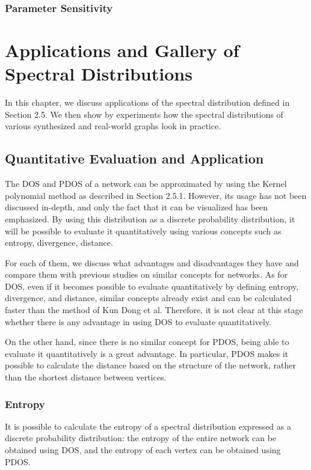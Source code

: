 \documentclass[senior,final,11pt]{iscs-thesis}
\begin{document}
\subsection{Parameter Sensitivity}




\chapter{Applications and Gallery of Spectral Distributions}
In this chapter, we discuss applications of the spectral distribution defined in Section 2.5. We then show by experiments how the spectral distributions of various synthesized and real-world graphs look in practice.

\section{Quantitative Evaluation and Application}
The DOS and PDOS of a network can be approximated by using the Kernel polynomial method as described in Section 2.5.1. However, its usage has not been discussed in-depth, and only the fact that it can be visualized has been emphasized.
By using this distribution as a discrete probability distribution, it will be possible to evaluate it quantitatively using various concepts such as entropy, divergence, distance.

For each of them, we discuss what advantages and disadvantages they have and compare them with previous studies on similar concepts for networks. As for DOS, even if it becomes possible to evaluate quantitatively by defining entropy, divergence, and distance, similar concepts already exist and can be calculated faster than the method of Kun Dong et al. Therefore, it is not clear at this stage whether there is any advantage in using DOS to evaluate quantitatively.

On the other hand, since there is no similar concept for PDOS, being able to evaluate it quantitatively is a great advantage. In particular, PDOS makes it possible to calculate the distance based on the structure of the network, rather than the shortest distance between vertices.

\subsection{Entropy}
It is possible to calculate the entropy of a spectral distribution expressed as a discrete probability distribution: the entropy of the entire network can be obtained using DOS, and the entropy of each vertex can be obtained using PDOS.
\end{document}
